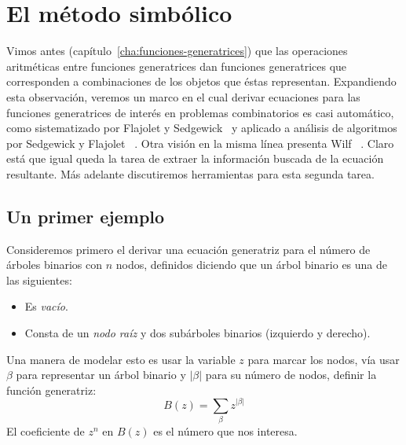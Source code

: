 %

\chapter{El método simbólico}
\label{cha:metodo-simbolico}

  Vimos antes
  (capítulo~\ref{cha:funciones-generatrices})
  que las operaciones aritméticas entre funciones generatrices
  dan funciones generatrices
  que corresponden a combinaciones
  de los objetos que éstas representan.%
  Expandiendo esta observación,
  veremos un marco en el cual derivar ecuaciones
  para las funciones generatrices de interés
  en problemas combinatorios
  es casi automático,
  como sistematizado por Flajolet y Sedgewick~%
    \cite{flajolet09:_analy_combin}
  y aplicado a análisis de algoritmos por Sedgewick y Flajolet~%
    \cite{sedgewick13:_introd_anal_algor}.
  Otra visión en la misma línea presenta Wilf~%
    \cite{wilf06:_gfology}.
  Claro está que igual queda la tarea
  de extraer la información buscada
  de la ecuación resultante.
  Más adelante discutiremos herramientas para esta segunda tarea.

\section{Un primer ejemplo}
\label{sec:MS-ejemplo}

  Consideremos primero el derivar una ecuación generatriz
  para el número de árboles binarios con \(n\) nodos,
  definidos diciendo que un árbol binario es una de las siguientes:
  \begin{itemize}
  \item
    Es \emph{vacío}.
  \item
    Consta de un \emph{nodo raíz} y dos subárboles binarios
    (izquierdo y derecho).
  \end{itemize}
  Una manera de modelar esto es usar la variable \(z\)
  para marcar los nodos,
  vía usar \(\beta\) para representar un árbol binario
  y \(\lvert \beta \rvert\) para su número de nodos,
  definir la función generatriz:
  \begin{equation*}
    B(z)
      = \sum_{\beta} z^{\lvert \beta \rvert}
  \end{equation*}
  El coeficiente de \(z^n\)
  en \(B(z)\) es el número que nos interesa.

